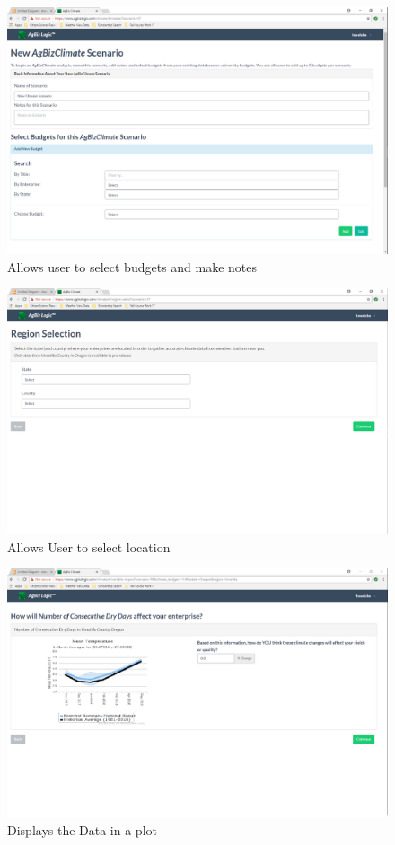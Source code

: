 \documentclass[onecolumn, draftclsnofoot,10pt, compsoc]{article}
\begin{document}
	\clearpage
	\begin{figure}[htb]				
		\includegraphics[width=\linewidth]{Figures/ClimateScenario.eps}
		\caption{Allows user to select budgets and make notes}
		\label{figure3.2}					
	\end{figure}
					
	\clearpage
	\begin{figure}[htb]
		\includegraphics[width=\linewidth]{Figures/SelectStateAndCounty.eps}
		\caption{Allows User to select location}
		\label{figure3.3}
	\end{figure}
	
	\clearpage
	\begin{figure}[htb]
		\includegraphics[width=\linewidth]{Figures/ChartPage.eps}
		\caption{Displays the Data in a plot}
		\label{figure3.4}
	\end{figure}
	
\end{document}
